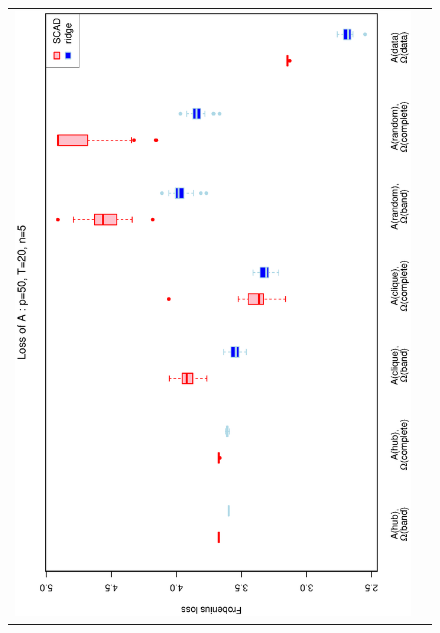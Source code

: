\begin{figure}[h!]
\centering
\begin{tabular}{cc}
\includegraphics[scale=0.45,angle=270]{LossA50T20N5_5.eps}
\\

\end{tabular}
\end{figure}
